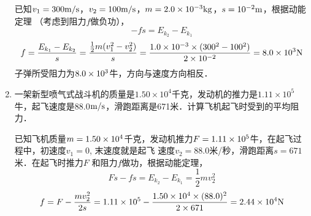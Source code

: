 \begin{enumerate}
\begin{figure}[htp]
    \caption{}
\end{figure}

\begin{solution}
已知$v_1=300\text{m}/\text{s}$，$v_2=100\text{m}/\text{s}$，$m=2.0\times10^{-3}{\rm kg}$，$s=10^{-2}{\rm m}$，根据动能定理
（考虑到阻力$f$做负功），
\[-fs=E_{k_2}-E_{k_1}\]
\[f=\frac{E_{k_1}-E_{k_2}}{s}=\frac{\frac{1}{2}m(v^2_1-v^2_2)}{s}=\frac{1.0\times 10^{-3}\times (300^2-100^2)}{2\times 10^{-2}}=8.0\times 10^3{\rm N}\]
子弹所受阻力为$8.0\times10^3$牛，方向与速度方向相反．
\end{solution}
\item 一架新型喷气式战斗机的质量是$1.50\times 10^4$千克，发动机的推力是$1.11\times 10^5$牛，起飞速度是88.0$\text{m}/\text{s}$，滑跑距离是671米．计算飞机起飞时受到的平均阻力．

\begin{solution}
    已知飞机质量$m=1.50\times10^4$千克，发动机推力$F=
    1.11\times10^5$牛，在起飞过程中，初速度$v_1=0$, 末速度就是起飞
    速度$v_2=88.0$米/秒，滑跑距离$s=671$米．在起飞时推力$F$
    和阻力$f$做功，根据动能定理，
\[Fs-fs=E_{k_2}-E_{k_1}=\frac{1}{2}mv^2_2\]
\[f=F-\frac{mv_2^2}{2s}=1.11\times 10^5-\frac{1.50\times 10^4\times (88.0)^2}{2\times 671}=2.44\times 10^4{\rm N}\]
\end{solution}
\end{enumerate}





